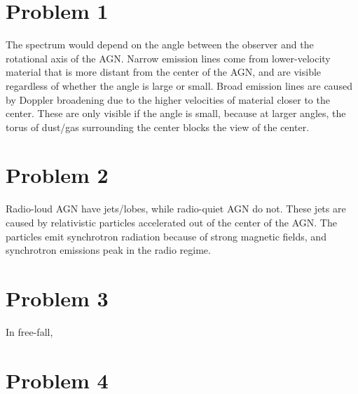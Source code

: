 \documentclass[11pt,letterpaper]{article}
\begin{document}
\section*{Problem 1}

The spectrum would depend on the angle between the observer and the rotational axis of the AGN. Narrow emission lines come from lower-velocity material that is more distant from the center of the AGN, and are visible regardless of whether the angle is large or small. Broad emission lines are caused by Doppler broadening due to the higher velocities of material closer to the center. These are only visible if the angle is small, because at larger angles, the torus of dust/gas surrounding the center blocks the view of the center. 

\section*{Problem 2}

Radio-loud AGN have jets/lobes, while radio-quiet AGN do not. These jets are caused by relativistic particles accelerated out of the center of the AGN. The particles emit synchrotron radiation because of strong magnetic fields, and synchrotron emissions peak in the radio regime. 

\section*{Problem 3}

In free-fall, 

\section*{Problem 4}
\end{document}
